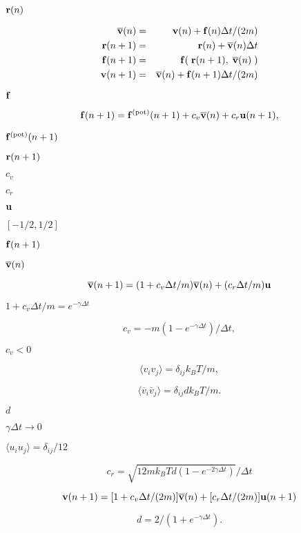 \documentclass{article}
\begin{document}
${\bf r}(n)$
\pagebreak

\begin{eqnarray*} \overline{\bf v}(n) & = & {\bf v}(n) + {\bf f}(n) \Delta t /(2m) \\ {\bf r}(n+1) & = & {\bf r}(n) + \overline{\bf v}(n)\Delta t \\ {\bf f}(n+1) & = & {\bf f}(\;{\bf r}(n+1),\; \overline{\bf v}(n)\; ) \\ {\bf v}(n+1) & = & \overline{\bf v}(n) + {\bf f}(n+1)\Delta t /(2m) \\ \end{eqnarray*}
\pagebreak

${\bf f}$
\pagebreak

\[ {\bf f}(n+1) = {\bf f}^{\rm (pot)}(n+1) + c_{v}\overline{\bf v}(n) + c_{r}{\bf u}(n+1), \]
\pagebreak

${\bf f}^{\rm (pot)}(n+1)$
\pagebreak

${\bf r}(n+1)$
\pagebreak

$c_{v}$
\pagebreak

$c_{r}$
\pagebreak

${\bf u}$
\pagebreak

$[-1/2, 1/2]$
\pagebreak

${\bf f}(n+1)$
\pagebreak

$\overline{\bf v}(n)$
\pagebreak

\[ \overline{\bf v} (n+1) = ( 1 + c_{v} \Delta t/m )\overline{\bf v}(n) + (c_{r}\Delta t/m) {\bf u} \]
\pagebreak

$1 + c_{v}\Delta t/m = e^{-\gamma\Delta t}$
\pagebreak

\[ c_{v} = -m (1 - e^{-\gamma\Delta t})/\Delta t , \]
\pagebreak

$c_{v} < 0$
\pagebreak

\[ \langle v_{i} v_{j} \rangle = \delta_{ij} k_{B}T/m , \]
\pagebreak

\[ \langle \overline{v}_{i} \overline{v}_{j} \rangle = \delta_{ij} d k_{B}T/m . \]
\pagebreak

$d$
\pagebreak

$\gamma\Delta t \rightarrow 0$
\pagebreak

$\langle u_{i} u_{j} \rangle = \delta_{ij}/12$
\pagebreak

\[ c_{r} = \sqrt{12 m k_{B}T d ( 1 - e^{-2\gamma\Delta t})}/\Delta t \]
\pagebreak

\[ {\bf v}(n+1) = [1 + c_{v}\Delta t/(2m)] \overline{\bf v}(n) + [c_{r} \Delta t/(2m)] {\bf u}(n+1) \]
\pagebreak

\[ d = 2/(1 + e^{-\gamma\Delta t}) . \]
\pagebreak
\end{document}
